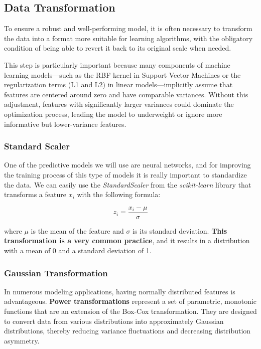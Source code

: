 \documentclass[11pt,english,a4paper,hidelinks]{book}
\begin{document}
\subsection{Data Transformation}

To ensure a robust and well-performing model, it is often necessary to transform the data into a format more suitable for learning algorithms, with the obligatory condition of being able to revert it back to its original scale when needed. 

\vspace{0.5cm}
\noindent This step is particularly important because many components of machine learning models—such as the RBF kernel in Support Vector Machines or the regularization terms (L1 and L2) in linear models—implicitly assume that features are centered around zero and have comparable variances. Without this adjustment, features with significantly larger variances could dominate the optimization process, leading the model to underweight or ignore more informative but lower-variance features.

\subsubsection{Standard Scaler}
One of the predictive models we will use are neural networks, and for improving the training process of this type of models it is really important to standardize the data. We can easily use the \textit{StandardScaler} from the \textit{scikit-learn} library that transforms a feature \(x_i\) with the following formula:

\begin{equation}
z_i = \frac{x_i - \mu}{\sigma}
\end{equation}

\noindent where \(\mu\) is the mean of the feature and \(\sigma\) is its standard deviation. \textbf{This transformation is a very common practice}, and it results in a distribution with a mean of 0 and a standard deviation of 1.



\subsubsection{Gaussian Transformation}

In numerous modeling applications, having normally distributed features is advantageous. \textbf{Power transformations} represent a set of parametric, monotonic functions that are an extension of the Box-Cox transformation. They are designed to convert data from various distributions into approximately Gaussian distributions, thereby reducing variance fluctuations and decreasing distribution asymmetry. 
\end{document}
